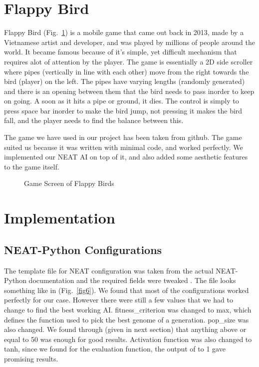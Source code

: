\documentclass[conference]{IEEEtran}
\begin{document}
\section{Flappy Bird}

Flappy Bird (Fig.~\ref{fig5}) is a mobile game that came out back in 2013, made by a Vietnamese artist and developer, and was played by millions of people around the world. It became famous because of it's simple, yet difficult mechanism that requires alot of attention by the player. The game is essentially a 2D side scroller where pipes (vertically in line with each other) move from the right towards the bird (player) on the left. The pipes have varying lengths (randomly generated) and there is an opening between them that the bird needs to pass inorder to keep on going. A soon as it hits a pipe or ground, it dies. The control is simply to press space bar inorder to make the bird jump, not pressing it makes the bird fall, and the player needs to find the balance between this.

The game we have used in our project has been taken from github. The game suited us because it was written with minimal code, and worked perfectly. We implemented our NEAT AI on top of it, and also added some aesthetic features to the game itself.

\begin{figure}[htbp]
\caption{Game Screen of Flappy Birds}
\label{fig5}
\end{figure}

\section{Implementation}

\subsection{NEAT-Python Configurations}

The template file for NEAT configuration was taken from the actual NEAT-Python documentation and the required fields were tweaked \cite{b3}. The file looks something like in (Fig.~\ref{fig6}). We found that most of the configurations worked perfectly for our case. However there were still a few values that we had to change to find the best working AI. fitness\_criterion was changed to max, which defines the function used to pick the best genome of a generation. pop\_size was also changed. We found through (given in next section) that anything above or equal to 50 was enough for good results. Activation function was also changed to tanh, since we found for the evaluation function, the output of  to 1 gave promising results.
\end{document}
